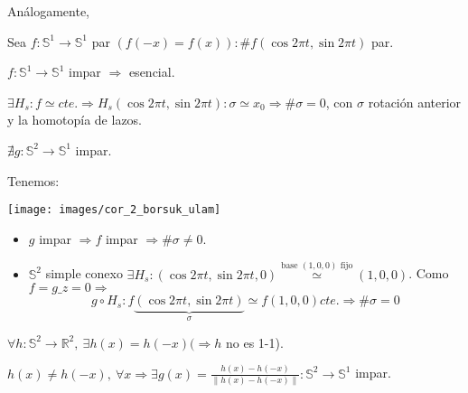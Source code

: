 Análogamente, 
\begin{theo}[de Hirsch]
Sea $f: \mathbb{S}^{1} \rightarrow \mathbb{S}^{1}$ par $\left( f\left( -x \right) = f\left( x \right) \right): \# f\left( \cos 2 \pi t, \sin 2 \pi t \right)$ par. 
\end{theo}
\begin{coro}
$f: \mathbb{S}^{1} \rightarrow \mathbb{S}^{1}$ impar $\Rightarrow$ esencial.
\end{coro}
\begin{demo}
$\exists H_s : f \simeq cte. \Rightarrow H_s\left( \cos 2 \pi t, \sin 2 \pi t \right) : \sigma \simeq x_0 \Rightarrow \# \sigma = 0$, con $\sigma$ rotación anterior y la homotopía de lazos.
\end{demo}
\begin{coro}[2]
$\nexists g: \mathbb{S}^{2} \rightarrow \mathbb{S}^{1}$ impar. 
\end{coro}
\begin{demo}
Tenemos:
\begin{center}
    \texttt{[image: images/cor\_2\_borsuk\_ulam]} 
\end{center}
\begin{itemize}
    \item $g$ impar $\Rightarrow f$ impar $\Rightarrow \# \sigma \neq 0$.

    \item $\mathbb{S}^{2}$ simple conexo $\exists H_s : \left( \cos 2 \pi t, \sin 2\pi t, 0 \right) \stackrel{\text{base } \left( 1, 0, 0 \right) \text{ fijo}}{\simeq} \left( 1, 0, 0 \right)$. Como $f = g\_{z = 0} \Rightarrow$
    \[
    g \circ H_s : f\underbrace{\left( \cos 2 \pi t, \sin 2 \pi t \right)}_{\sigma} \simeq f\left( 1, 0, 0 \right) cte. \Rightarrow \# \sigma = 0
    \]
\end{itemize}
\end{demo}
\begin{coro}[3]
$\forall h: \mathbb{S}^{2} \rightarrow \mathbb{R}^{2},\ \exists h\left( x \right) = h\left( -x \right) (\Rightarrow h$ no es 1-1).  
\end{coro}
\begin{demo}
$h\left( x \right) \neq h\left( -x \right),\ \forall x \Rightarrow \exists g \left( x \right) = \frac{h\left( x \right) - h\left( -x \right)}{\lVert h\left( x \right) - h\left( -x \right) \rVert}: \mathbb{S}^{2} \rightarrow \mathbb{S}^{1}$ impar.
\end{demo}

